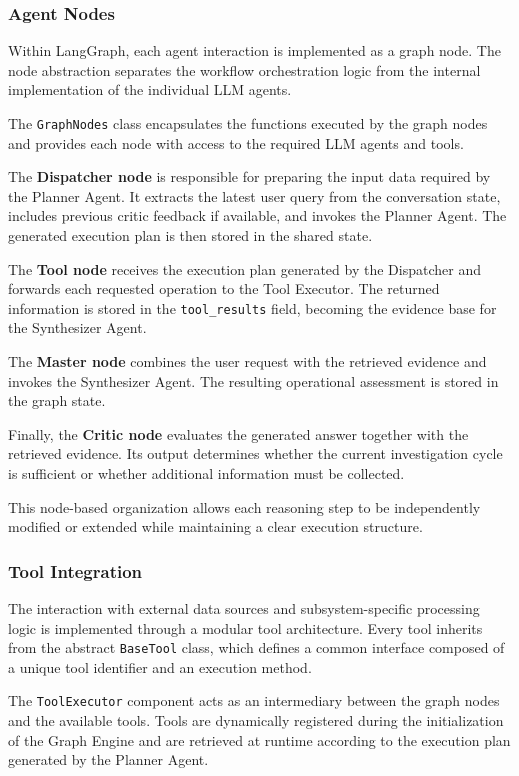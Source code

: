 \subsubsection{Agent Nodes}

Within LangGraph, each agent interaction is implemented as a graph node. The node abstraction separates the workflow orchestration logic from the internal implementation of the individual LLM agents.

The \texttt{GraphNodes} class encapsulates the functions executed by the graph nodes and provides each node with access to the required LLM agents and tools.

The \textbf{Dispatcher node} is responsible for preparing the input data required by the Planner Agent. It extracts the latest user query from the conversation state, includes previous critic feedback if available, and invokes the Planner Agent. The generated execution plan is then stored in the shared state.

The \textbf{Tool node} receives the execution plan generated by the Dispatcher and forwards each requested operation to the Tool Executor. The returned information is stored in the \texttt{tool\_results} field, becoming the evidence base for the Synthesizer Agent.

The \textbf{Master node} combines the user request with the retrieved evidence and invokes the Synthesizer Agent. The resulting operational assessment is stored in the graph state.

Finally, the \textbf{Critic node} evaluates the generated answer together with the retrieved evidence. Its output determines whether the current investigation cycle is sufficient or whether additional information must be collected.

This node-based organization allows each reasoning step to be independently modified or extended while maintaining a clear execution structure.

\subsubsection{Tool Integration}

The interaction with external data sources and subsystem-specific processing logic is implemented through a modular tool architecture. Every tool inherits from the abstract \texttt{BaseTool} class, which defines a common interface composed of a unique tool identifier and an execution method.

The \texttt{ToolExecutor} component acts as an intermediary between the graph nodes and the available tools. Tools are dynamically registered during the initialization of the Graph Engine and are retrieved at runtime according to the execution plan generated by the Planner Agent.


